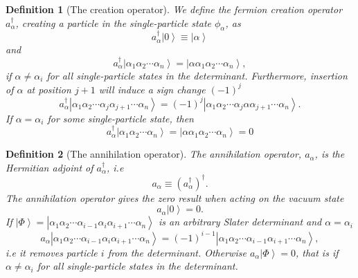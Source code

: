 \documentclass[a4paper,10pt]{article}
\newcommand{\ket}[1]{\left| #1 \right\rangle} \newcommand{\element}[3]
\theoremstyle{definition}
\newtheorem{definition}{Definition}
\begin{document}
\begin{definition}[The creation operator]
 We define the fermion creation operator $a_\alpha^\dagger$, creating a particle in the single-particle state $\phi_\alpha$, as
 \begin{equation}
  a_\alpha^\dagger \ket{0} \equiv \ket{\alpha}
 \end{equation}
 and 
 \begin{equation}
  a_\alpha^\dagger \ket{\alpha_1 \alpha_2 \cdots \alpha_n} = \ket{\alpha \alpha_1 \alpha_2 \cdots \alpha_n},
 \end{equation}
 if $\alpha \neq \alpha_i$ for all single-particle states in the determinant. 
 Furthermore, insertion of $\alpha$ at position $j+1$ will induce a sign change $(-1)^j$
 \begin{equation}
  a_\alpha^\dagger \ket{\alpha_1 \alpha_2 \cdots \alpha_j \alpha_{j+1} \cdots \alpha_n} = (-1)^j\ket{\alpha_1 \alpha_2 \cdots \alpha_j \alpha \alpha_{j+1} \cdots \alpha_n}.
 \end{equation}
 If $\alpha = \alpha_i$ for some single-particle state, then 
 \begin{equation}
  a_\alpha^\dagger \ket{\alpha_1 \alpha_2 \cdots \alpha_n} = \ket{\alpha \alpha_1 \alpha_2 \cdots \alpha_n} = 0
 \end{equation}
\end{definition}

\begin{definition}[The annihilation operator]
The annihilation operator, $a_\alpha$, is the Hermitian adjoint of $a_\alpha^\dagger$, i.e 
\begin{equation}
a_\alpha \equiv (a_\alpha^\dagger)^\dagger. 
\end{equation}
The annihilation operator gives the zero result when acting on the vacuum state 
\begin{equation}
 a_\alpha \ket{0} = 0.
\end{equation}
If $\ket{\Phi} = \ket{\alpha_1 \alpha_2 \cdots \alpha_{i-1} \alpha_{i} \alpha_{i+1} \cdots \alpha_n}$ is an 
arbitrary Slater determinant and $\alpha = \alpha_i$
\begin{equation}
 a_\alpha \ket{\alpha_1 \alpha_2 \cdots \alpha_{i-1} \alpha_{i} \alpha_{i+1} \cdots \alpha_n} = (-1)^{i-1}\ket{\alpha_1 \alpha_2 \cdots \alpha_{i-1}  \alpha_{i+1} \cdots \alpha_n},
\end{equation}
i.e it removes particle $i$ from the determinant. Otherwise $a_\alpha \ket{\Phi} = 0$, that is if 
$\alpha \neq \alpha_i$ for all single-particle states in the determinant.
\end{definition}
\end{document}
